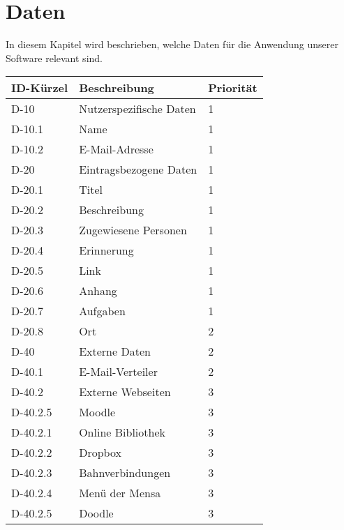 
\chapter{Daten}

In diesem Kapitel wird beschrieben, welche Daten für die Anwendung unserer Software relevant sind.\\
\begin{table}[H]
    \caption{Daten}
    \begin{longtable}{|l|p{5cm}|l|}
        \toprule
        \textbf{ID-Kürzel} & \textbf{Beschreibung} & \textbf{Priorität}\\
        \hline
        \endhead
 

        D-10 & Nutzerspezifische Daten & 1\\
        D-10.1 & Name &1\\
        D-10.2 & E-Mail-Adresse &1 \\       
        \hline
        D-20 & Eintragsbezogene Daten & 1\\
        D-20.1 & Titel &1\\
        D-20.2 & Beschreibung & 1\\
        D-20.3 & Zugewiesene Personen & 1\\
        D-20.4 & Erinnerung &1\\
        D-20.5 & Link &1\\
        D-20.6 & Anhang &1\\
        D-20.7 & Aufgaben & 1\\
        D-20.8 & Ort &  2\\
        \hline
        D-40 & Externe Daten & 2\\
        D-40.1 & E-Mail-Verteiler & 2\\
        D-40.2 & Externe Webseiten & 3 \\
        D-40.2.5 & Moodle & 3\\        
        D-40.2.1 & Online Bibliothek & 3\\
        D-40.2.2 & Dropbox & 3 \\
        D-40.2.3 & Bahnverbindungen & 3\\
        D-40.2.4 & Menü der Mensa & 3\\
        D-40.2.5 & Doodle & 3\\        
        \hline
    \end{longtable}
\end{table}


